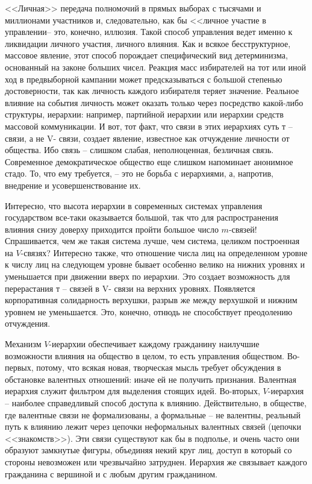 \documentclass{book}
\begin{document}
<<Личная>> передача полномочий в прямых выборах с тысячами и миллионами участников и, следовательно, как бы <<личное уча­стие в управлении-- это, конечно, иллюзия. Такой способ управле­ния ведет именно к ликвидации личного участия, личного влия­ния. Как и всякое бесструктурное, массовое явление, этот спо­соб порождает специфический вид детерминизма, основанный на законе больших чисел. Реакция масс избирателей на тот или иной ход в предвыборной кампании может предсказываться с большой степенью достоверности, так как личность каждо­го избирателя теряет значение. Реальное влияние на события личность может оказать только через посредство какой-либо структуры, иерархии: например, партийной иерархии или иерар­хии средств массовой коммуникации. И вот, тот факт, что связи в этих иерархиях суть т --  связи, а не V-  связи, создает явление, известное как отчуждение  личности от общества. Ибо связь -- слишком слабая, неполноценная, безличная связь. Современное демократическое общество еще слишком напоминает аноним­ное 
стадо.  То, что ему требуется, -- это не борьба с иерархиями, а, напротив, внедрение и усовершенствование их.

Интересно, что высота иерархии в современных системах уп­равления государством все-таки оказывается большой, так что для распространения влияния снизу доверху приходится пройти большое число $m$-связей! Спрашивается, чем же такая система лучше, чем система, целиком построенная на $V$-связях? Инте­ресно также, что отношение числа лиц на определенном уровне к числу лиц на следующем уровне бывает особенно велико на нижних уровнях и уменьшается при движении вверх по иерар­хии. Это создает возможность для перерастания т --  связей в V-  связи на верхних уровнях. Появляется корпоративная соли­дарность верхушки, разрыв же между верхушкой и нижним уровнем не уменьшается. Это, конечно, отнюдь не способствует преодолению отчуждения.

Механизм $V$-иерархии обеспечивает каждому гражданину наилучшие возможности влияния на общество в целом, то есть управления обществом. Во-первых, потому, что всякая новая, творческая мысль требует обсуждения в обстановке валентных отношений: иначе ей не получить признания. Валентная иерархия служит фильтром для выделения стоящих идей. Во-вторых, $V$-иерархия -- наиболее справедливый  способ до­ступа к влиянию. Действительно, в обществе, где валентные связи не формализованы, а формальные -- не валентны, реальный путь к влиянию лежит через цепочки неформальных валентных связей (цепочки <<знакомств>>). Эти связи существуют как бы в подполье, и очень часто они образуют замкнутые фигуры, объе­диняя некий круг лиц, доступ в который со стороны невозможен или чрезвычайно затруднен. Иерархия же связывает каждого гражданина с вершиной и с любым другим гражданином.
\end{document}
